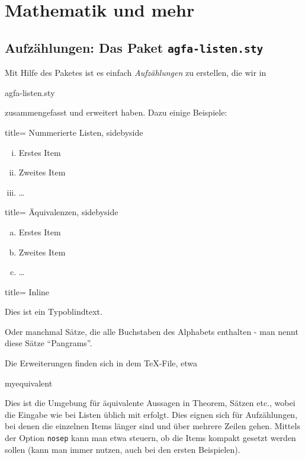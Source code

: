 \thispagestyle{empty}
\section{Mathematik und mehr}\label{sec:section2}
\subsection{Aufzählungen: Das Paket \texttt{agfa-listen.sty}}\label{subsec:agfa-listen}
%
Mit Hilfe des Paketes  ist es einfach \emph{Aufzählungen} zu erstellen, die wir in 
%
\begin{tcolorbox}
agfa-listen.sty
\end{tcolorbox}
%
zusammengefasst und erweitert haben.
Dazu einige Beispiele: 
%
\begin{tcblisting}{title= Nummerierte Listen, sidebyside }
\begin{enumerate}[(i)]
\item
Erstes Item
\item
Zweites Item
\item
\ldots
\end{enumerate}
\end{tcblisting}
%
\begin{tcblisting}{title= Äquivalenzen, sidebyside }
\begin{enumerate}[(a)]
\item
Erstes Item
\item
Zweites Item
\item
\ldots
\end{enumerate}
\end{tcblisting}
%
\begin{tcblisting}{title= Inline}
\begin{enumerate*}[(1)]
\item
Dies ist ein Typoblindtext. 

\item
Oder manchmal Sätze, die alle Buchstaben des Alphabets enthalten - man nennt diese Sätze \enquote{Pangrams}. 

\end{enumerate*}
\end{tcblisting}
%
Die Erweiterungen finden sich in dem \og \TeX{}-File, etwa
%
\begin{docEnvironment}{myequivalent}{}
\end{docEnvironment}
%
Dies ist die Umgebung für äquivalente Aussagen in Theorem, Sätzen etc., wobei die Eingabe wie bei Listen üblich mit  erfolgt.
Dies eignen sich für Aufzählungen, bei denen die einzelnen Items länger sind und über mehrere Zeilen gehen.
Mittels der Option \texttt{nosep} kann man etwa steuern, ob die Items kompakt gesetzt werden sollen (kann man immer nutzen, auch bei den ersten Beispielen).

